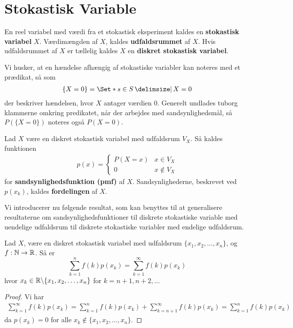 \section{Stokastisk Variable} \label{sec:SV}
\begin{defn}%
En reel variabel med værdi fra et stokastisk eksperiment kaldes en \textbf{stokastisk variabel} $X$. Værdimængden af $X$, kaldes \textbf{udfaldsrummet} af $X$. Hvis udfaldsrummet af $X$ er tællelig kaldes $X$ en \textbf{diskret stokastisk variabel}.
\end{defn}

Vi husker, at en hændelse afhængig af stokastiske variabler kan noteres med et prædikat, så som
\begin{align*}
    \{X=0\}=\Set*{s\in S\given X=0}
\end{align*}
der beskriver hændelsen, hvor $X$ antager værdien $0$.
Generelt undlades tuborg klammerne omkring predikatet, når der arbejdes med sandsynlighedsmål, så $P(\{X = 0\})$ noteres også $P(X = 0)$.

\begin{defn} [Sandsynlighedsfunktion]%
    Lad $X$ være en diskret stokastisk variabel med udfaldsrum $V_X$. Så kaldes funktionen
\begin{align*}
    p(x)=
    \begin{cases}
        P(X=x) & x\in V_X\\
        0 & x\not\in V_X
    \end{cases}
\end{align*}
for \textbf{sandsynlighedsfunktion (pmf)} af $X$. Sandsynlighederne, beskrevet ved $p(x_k)$, kaldes \textbf{fordelingen} af $X$.
\end{defn}
Vi introducerer nu følgende resultat, som kan benyttes til at generalisere resultaterne om sandsynlighedsfunktioner til diskrete stokastiske variable med uendelige udfaldsrum til diskrete stokastiske variabler med endelige udfaldsrum.
\begin{lem}
Lad $X$, være en diskret stokastisk variabel med udfaldsrum $\{x_1, x_2, \ldots, x_n\}$, og $f: \mathbb{N} \to \mathbb{R}$. Så er 
\begin{equation*}
    \sum^n_{k = 1} f(k) p(x_k) = \sum^\infty_{k = 1} f(k) p(x_k)
\end{equation*}
hvor $x_k \in \mathbb{R} \backslash \{x_1, x_2, \ldots, x_n\}$ for $k = n + 1, n + 2, \ldots$
\end{lem}
\begin{proof}
Vi har 
\begin{align*}
    \sum^\infty_{k = 1} f(k) p(x_k) =\sum^n_{k = 1} f(k) p(x_k) + \sum^\infty_{k = n + 1} f(k) p(x_k) = \sum^n_{k = 1} f(k) p(x_k) 
\end{align*}
da $p(x_k) = 0$ for alle $x_k \not \in \{x_1, x_2, \ldots, x_n\}$.
\end{proof}




